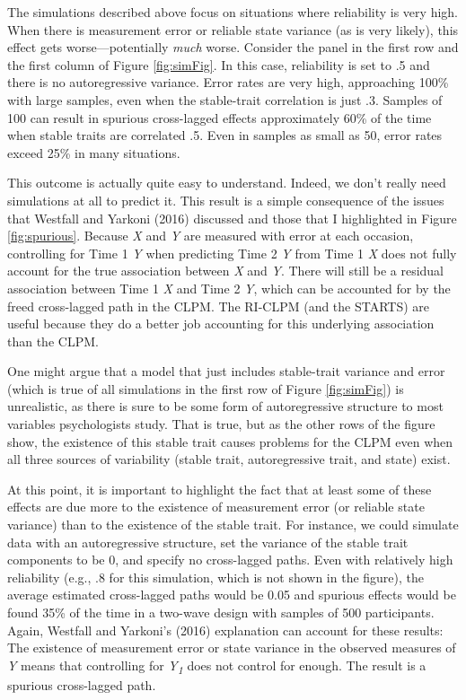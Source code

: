 \documentclass[
  english,
  man,floatsintext]{apa6}
\begin{document}
The simulations described above focus on situations where reliability is very high. When there is measurement error or reliable state variance (as is very likely), this effect gets worse---potentially \emph{much} worse. Consider the panel in the first row and the first column of Figure \ref{fig:simFig}. In this case, reliability is set to .5 and there is no autoregressive variance. Error rates are very high, approaching 100\% with large samples, even when the stable-trait correlation is just .3. Samples of 100 can result in spurious cross-lagged effects approximately 60\% of the time when stable traits are correlated .5. Even in samples as small as 50, error rates exceed 25\% in many situations.

This outcome is actually quite easy to understand. Indeed, we don't really need simulations at all to predict it. This result is a simple consequence of the issues that Westfall and Yarkoni (2016) discussed and those that I highlighted in Figure \ref{fig:spurious}. Because \emph{X} and \emph{Y} are measured with error at each occasion, controlling for Time 1 \emph{Y} when predicting Time 2 \emph{Y} from Time 1 \emph{X} does not fully account for the true association between \emph{X} and \emph{Y}. There will still be a residual association between Time 1 \emph{X} and Time 2 \emph{Y}, which can be accounted for by the freed cross-lagged path in the CLPM. The RI-CLPM (and the STARTS) are useful because they do a better job accounting for this underlying association than the CLPM.

One might argue that a model that just includes stable-trait variance and error (which is true of all simulations in the first row of Figure \ref{fig:simFig}) is unrealistic, as there is sure to be some form of autoregressive structure to most variables psychologists study. That is true, but as the other rows of the figure show, the existence of this stable trait causes problems for the CLPM even when all three sources of variability (stable trait, autoregressive trait, and state) exist.

At this point, it is important to highlight the fact that at least some of these effects are due more to the existence of measurement error (or reliable state variance) than to the existence of the stable trait. For instance, we could simulate data with an autoregressive structure, set the variance of the stable trait components to be 0, and specify no cross-lagged paths. Even with relatively high reliability (e.g., .8 for this simulation, which is not shown in the figure), the average estimated cross-lagged paths would be 0.05 and spurious effects would be found 35\% of the time in a two-wave design with samples of 500 participants. Again, Westfall and Yarkoni's (2016) explanation can account for these results: The existence of measurement error or state variance in the observed measures of \emph{Y} means that controlling for \emph{Y\textsubscript{1}} does not control for enough. The result is a spurious cross-lagged path.
\end{document}

